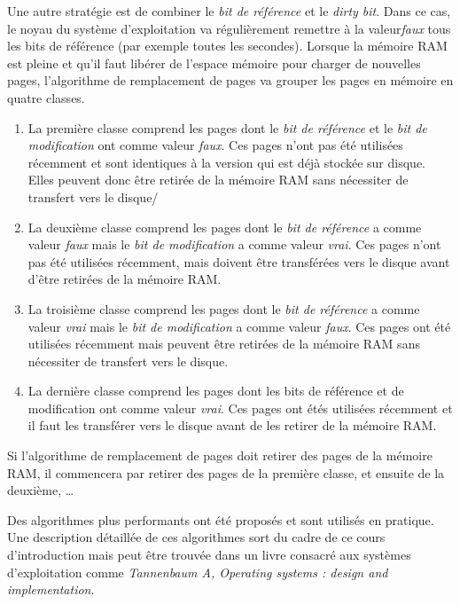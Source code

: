 Une autre stratégie est de combiner le \textit{bit de référence} et
le \textit{dirty bit}. Dans ce cas, le noyau du système d'exploitation
va régulièrement remettre à la valeur\textit{faux} tous les bits de
référence (par exemple toutes les secondes). Lorsque la mémoire RAM est
pleine et qu'il faut libérer de l'espace mémoire pour charger de
nouvelles pages, l'algorithme de remplacement de pages va grouper les
pages en mémoire en quatre classes. \newline

\begin{enumerate}
    \item La première classe comprend les pages dont le \textit{bit de
        référence} et le \textit{bit de modification} ont comme valeur
        \textit{faux}. Ces pages n'ont pas été utilisées récemment et
        sont identiques à la version qui est déjà stockée sur disque.
        Elles peuvent donc être retirée de la mémoire RAM sans
        nécessiter de transfert vers le disque/
    \item La deuxième classe comprend les pages dont le \textit{bit de
        référence} a comme valeur \textit{faux} mais le \textit{bit de
        modification} a comme valeur \textit{vrai}. Ces pages n'ont pas
        été utilisées récemment, mais doivent être transférées vers le
        disque avant d'être retirées de la mémoire RAM.
    \item La troisième classe comprend les pages dont le \textit{bit de
        référence} a comme valeur \textit{vrai} mais le \textit{bit de
        modification} a comme valeur \textit{faux}. Ces pages ont été
        utilisées récemment mais peuvent être retirées de la mémoire RAM
        sans nécessiter de transfert vers le disque.
    \item La dernière classe comprend les pages dont les bits de
        référence et de modification ont comme valeur \textit{vrai}. Ces
        pages ont étés utilisées récemment et il faut les transférer
        vers le disque avant de les retirer de la mémoire RAM.
\end{enumerate}

Si l'algorithme de remplacement de pages doit retirer des pages de la
mémoire RAM, il commencera par retirer des pages de la première
classe, et ensuite de la deuxième, \ldots
  
Des algorithmes plus performants ont été proposés et sont utilisés en
pratique. Une description détaillée de ces algorithmes sort du cadre
de ce cours d'introduction mais peut être trouvée dans un livre
consacré aux systèmes d'exploitation comme \textit{Tannenbaum A,
Operating systems : design and implementation}.
  
